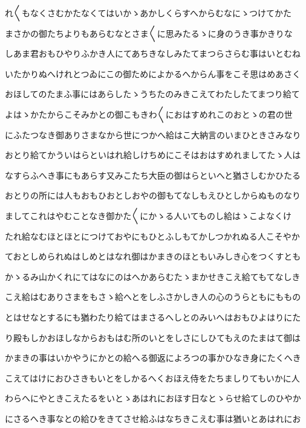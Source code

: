 \documentclass[a4paper,11pt,landscape]{ltjtarticle}
\begin{document}
\par\medskip
れ〱もなくさむかたなくてはいかゝあかしくらすへからむなにゝつけてかた
\par\medskip
まさかの御たちよりもあらむなとさま〱に思みたるゝに身のうき事かきりな
\par\medskip
しあま君おもひやりふかき人にてあちきなしみたてまつらさらむ事はいとむね
\par\medskip
いたかりぬへけれとつゐにこの御ためによかるへからん事をこそ思はめあさく
\par\medskip
おほしてのたまふ事にはあらしたゝうちたのみきこえてわたしたてまつり給て
\par\medskip
よはゝかたからこそみかとの御こもきわ〱におはすめれこのおとゝの君の世
\par\medskip
にふたつなき御ありさまなから世につかへ給はこ大納言のいまひときさみなり
\par\medskip
おとり給てかういはらといはれ給しけちめにこそはおはすめれましてたゝ人は
\par\medskip
なすらふへき事にもあらす又みこたち大臣の御はらといへと猶さしむかひたる
\par\medskip
おとりの所には人もおもひおとしおやの御もてなしもえひとしからぬものなり
\par\medskip
ましてこれはやむことなき御かた〱にかゝる人いてものし給はゝこよなくけ
\par\medskip
たれ給なむほとほとにつけておやにもひとふしもてかしつかれぬる人こそやか
\par\medskip
ておとしめられぬはしめとはなれ御はかまきのほともいみしき心をつくすとも
\par\medskip
かゝるみ山かくれにてはなにのはへかあらむたゝまかせきこえ給てもてなしき
\par\medskip
こえ給はむありさまをもさゝ給へとをしふさかしき人の心のうらともにももの
\par\medskip
とはせなとするにも猶わたり給てはまさるへしとのみいへはおもひよはりにた
\par\medskip
り殿もしかおほしなからおもはむ所のいとをしさにしひてもえのたまはて御は
\par\medskip
かまきの事はいかやうにかとの給へる御返によろつの事かひなき身にたくへき
\par\medskip
こえてはけにおひさきもいとをしかるへくおほえ侍をたちましりてもいかに人
\par\medskip
わらへにやときこえたるをいとゝあはれにおほす日なとゝらせ給てしのひやか
\par\medskip
にさるへき事なとの給ひをきてさせ給ふはなちきこえむ事は猶いとあはれにお
\par\medskip
\end{document}
